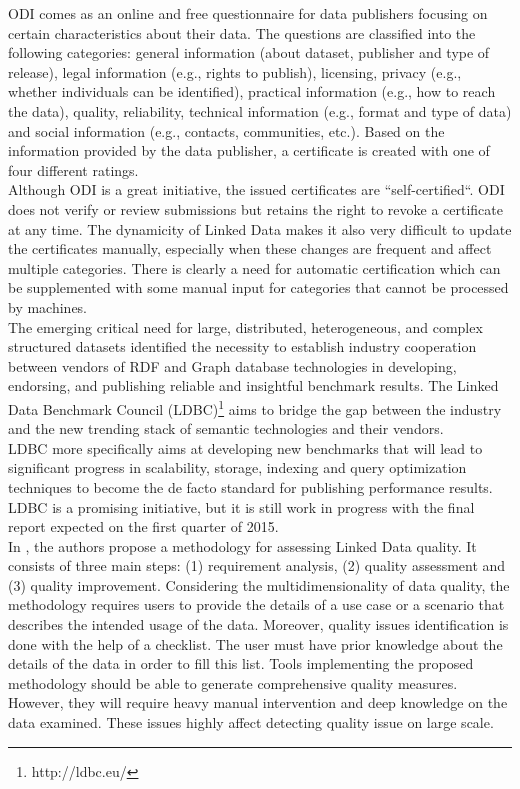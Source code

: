 \documentclass[onecolumn, crcready]{iosart2c}
\begin{document}
ODI comes as an online and free questionnaire for data publishers focusing on certain characteristics about their data. The questions are classified into the following categories: general information (about dataset, publisher and type of release), legal information (e.g., rights to publish), licensing, privacy (e.g., whether individuals can be identified), practical information (e.g., how to reach the data), quality, reliability, technical information (e.g., format and type of data) and social information (e.g., contacts, communities, etc.). Based on the information provided  by the data  publisher,  a certificate  is created  with one of four different ratings.\\
Although ODI is a great initiative, the issued certificates are “self-certified“. ODI does not verify or review submissions but retains the right to revoke a certificate at any time. The dynamicity of Linked Data  makes it also very difficult to update the certificates manually, especially when these changes are frequent and affect multiple categories. There is clearly a need for automatic certification which can be supplemented with some manual input for categories that cannot be processed by machines.\\

The emerging critical need for large, distributed, heterogeneous, and complex structured datasets identified the necessity to establish industry cooperation between vendors of RDF and Graph database technologies in developing, endorsing, and publishing reliable and insightful benchmark results. The Linked Data Benchmark Council (LDBC)\footnote{http://ldbc.eu/} aims to bridge the gap between the industry and the new trending stack of semantic technologies and their vendors. \\ LDBC more specifically aims at developing new benchmarks that will lead to significant progress in scalability, storage, indexing and query optimization techniques to become the de facto standard for publishing performance results. LDBC is a promising initiative, but it is still work in progress with the final report expected on the first quarter of 2015.\\

In \cite{DBLP:conf/i-semantics/RulaZ14}, the authors propose a methodology for assessing Linked Data quality. It consists of three main steps: (1) requirement analysis, (2) quality assessment and (3) quality improvement. Considering the multidimensionality of data quality, the methodology requires users to provide the details of a use case or a scenario that describes the intended usage of the data. Moreover, quality issues identification is done with the help of a checklist. The user must have prior knowledge about the details of the data in order to fill this list.
Tools implementing the proposed methodology should be able to generate comprehensive quality measures. However, they will require heavy manual intervention and deep knowledge on the data examined. These issues highly affect detecting quality issue on large scale.\\
\end{document}

